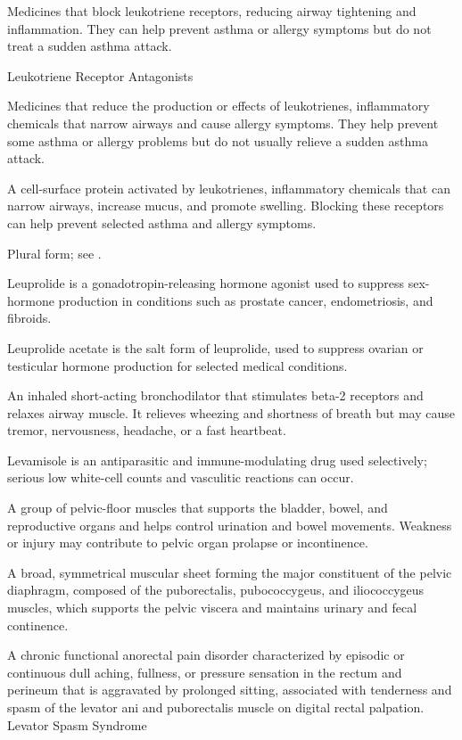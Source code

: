  Medicines that block leukotriene receptors, reducing airway tightening and inflammation. They can help prevent asthma or allergy symptoms but do not treat a sudden asthma attack.

\synonyms
Leukotriene Receptor Antagonists

 Medicines that reduce the production or effects of leukotrienes, inflammatory chemicals that narrow airways and cause allergy symptoms. They help prevent some asthma or allergy problems but do not usually relieve a sudden asthma attack.

 A cell-surface protein activated by leukotrienes, inflammatory chemicals that can narrow airways, increase mucus, and promote swelling. Blocking these receptors can help prevent selected asthma and allergy symptoms.

 Plural form; see .

 Leuprolide is a gonadotropin-releasing hormone agonist used to suppress sex-hormone production in conditions such as prostate cancer, endometriosis, and fibroids.

 Leuprolide acetate is the salt form of leuprolide, used to suppress ovarian or testicular hormone production for selected medical conditions.

 An inhaled short-acting bronchodilator that stimulates beta-2 receptors and relaxes airway muscle. It relieves wheezing and shortness of breath but may cause tremor, nervousness, headache, or a fast heartbeat.

 Levamisole is an antiparasitic and immune-modulating drug used selectively; serious low white-cell counts and vasculitic reactions can occur.

 A group of pelvic-floor muscles that supports the bladder, bowel, and reproductive organs and helps control urination and bowel movements. Weakness or injury may contribute to pelvic organ prolapse or incontinence.

 A broad, symmetrical muscular sheet forming the major constituent of the pelvic diaphragm, composed of the puborectalis, pubococcygeus, and iliococcygeus muscles, which supports the pelvic viscera and maintains urinary and fecal continence.

 A chronic functional anorectal pain disorder characterized by episodic or continuous dull aching, fullness, or pressure sensation in the rectum and perineum that is aggravated by prolonged sitting, associated with tenderness and spasm of the levator ani and puborectalis muscle on digital rectal palpation.
\synonyms
Levator Spasm Syndrome

